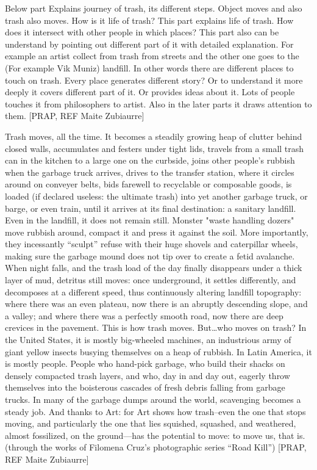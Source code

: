 Below part Explains journey of trash, its different steps. Object moves and also trash also moves. How is it life of trash? This part explains life of trash. How does it intersect with other people in which places? This part also can be understand by pointing out different part of it with detailed explanation. For example an artist collect from trash from streets and the other one goes to the (For example Vik Muniz) landfill. In other words there are different places to touch on trash. Every place generates different story? Or to understand it more deeply it covers different part of it. Or provides ideas about it. Lots of people touches it from philosophers to artist. Also in the later parts it draws attention to them. [PRAP, REF Maite Zubiaurre]

Trash moves, all the time. It becomes a steadily growing heap of clutter behind closed walls, accumulates and festers under tight lids, travels from a small trash can in the kitchen to a large one on the curbside, joins other people’s rubbish when the garbage truck arrives, drives to the transfer station, where it circles around on conveyer belts, bids farewell to recyclable or composable goods, is loaded (if declared useless: the ultimate trash) into yet another garbage truck, or barge, or even train, until it arrives at its final destination: a sanitary landfill. Even in the landfill, it does not remain still. Monster "waste handling dozers" move rubbish around, compact it and press it against the soil. More importantly, they incessantly “sculpt” refuse with their huge shovels and caterpillar wheels, making sure the garbage mound does not tip over to create a fetid avalanche. When night falls, and the trash load of the day finally disappears under a thick layer of mud, detritus still moves: once underground, it settles differently, and decomposes at a different speed, thus continuously altering landfill topography: where there was an even plateau, now there is an abruptly descending slope, and a valley; and where there was a perfectly smooth road, now there are deep crevices in the pavement. This is how trash moves. But\ldots who moves on trash? In the United States, it is mostly big-wheeled machines, an industrious army of giant yellow insects busying themselves on a heap of rubbish. In Latin America, it is mostly people. People who hand-pick garbage, who build their shacks on densely compacted trash layers, and who, day in and day out, eagerly throw themselves into the boisterous cascades of fresh debris falling from garbage trucks. In many of the garbage dumps around the world, scavenging becomes a steady job.  And
thanks to Art: for Art shows how trash--even the one that stops moving, and particularly the one that lies squished, squashed, and weathered, almost fossilized, on the ground---has the potential to move: to move us, that is. (through the works of Filomena Cruz's photographic series “Road Kill”) [PRAP, REF Maite Zubiaurre]

